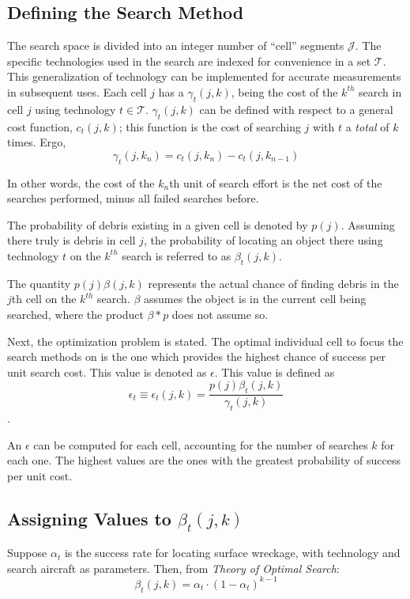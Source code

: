\documentclass[a4paper]{article}
\begin{document}
\subsection{Defining the Search Method}

The search space is divided into an integer number of ``cell'' segments $\mathcal{J}$. The specific technologies used in the search are indexed for convenience in a set $\mathcal{T}$. This generalization of technology can be implemented for accurate measurements in subsequent uses. Each cell $j$ has a $\gamma_t(j,k)$, being the cost of the $k^{th}$ search in cell $j$ using technology $t\in\mathcal{T}$. $\gamma_t(j,k)$ can be defined with respect to a general cost function, $c_t(j,k)$; this function is the cost of searching $j$ with $t$ a \textit{total} of $k$ times. Ergo, $$\gamma_t(j,k_n)=c_t(j,k_n)-c_t(j,k_{n-1})$$

In other words, the cost of the $k_n$th unit of search effort is the net cost of the searches performed, minus all failed searches before.

The probability of debris existing in a given cell is denoted by $p(j)$. Assuming there truly is debris in cell $j$, the probability of locating an object there using technology $t$ on the $k^{th}$ search is referred to as $\beta_t(j,k)$.

The quantity $p(j)\beta(j,k)$ represents the actual chance of finding debris in the $j$th cell on the $k^{th}$ search. $\beta$ assumes the object is in the current cell being searched, where the product $\beta * p$ does not assume so.

Next, the optimization problem is stated. The optimal individual cell to focus the search methods on is the one which provides the highest chance of success per unit search cost. This value is denoted as $\epsilon$. This value is defined as $$\epsilon_t\equiv\epsilon_t(j,k)=\frac{p(j)\beta_t(j,k)}{\gamma_t(j,k)}$$. 

An $\epsilon$ can be computed for each cell, accounting for the number of searches $k$ for each one. The highest values are the ones with the greatest probability of success per unit cost. 

\subsection{Assigning Values to $\beta_t(j,k)$}

Suppose $\alpha_t$ is the success rate for locating surface wreckage, with technology and search aircraft as parameters. Then, from \textit{Theory of Optimal Search}: \[\beta_t(j,k)=\alpha_t\cdot(1-\alpha_t)^{k-1}\]
\end{document}
